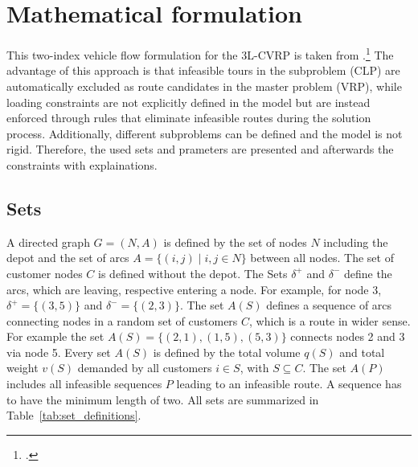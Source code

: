 \section{Mathematical formulation}
\label{sec:mathematical_formulation}

This two-index vehicle flow formulation for the \gls{3L-CVRP} is taken from \cite{tamke_branch-and-cut_2024}.\footcite[cf.][p. 6f]{tamke_branch-and-cut_2024}
The advantage of this approach is that infeasible tours in the subproblem (\gls{CLP}) are automatically excluded as route candidates
in the master problem (\gls{VRP}), while loading constraints are not explicitly defined in the model but are instead enforced through
rules that eliminate infeasible routes during the solution process. Additionally, different subproblems can be defined and the model is
not rigid. Therefore, the used sets and prameters are presented and afterwards the constraints with explainations.

\subsection*{Sets}
A directed graph $G=(N,A)$ is defined by the set of nodes $N$ including the depot and the set of arcs
$A = \{ (i, j) \mid i, j \in N \}$ between all nodes. The set of customer nodes $C$ is defined without the depot.
The Sets $\delta^+$ and $\delta^-$ define the arcs, which are leaving, respective entering a node.
For example, for node 3, $\delta^+ = \{(3,5)\}$ and $\delta^-= \{(2,3)\}$.
The set $A(S)$ defines a sequence of arcs connecting nodes in a random set of customers $C$,
which is a route in wider sense. For example the set $A(S)=\{(2,1),(1,5),(5,3)\}$ connects nodes
2 and 3 via node 5. Every set $A(S)$ is defined by the total volume $q(S)$ and total weight $v(S)$
demanded by all customers $i \in S$, with $S \subseteq C$. The set $A(P)$ includes all infeasible sequences $P$ leading
to an infeasible route. A sequence has to have the minimum length of two. All sets are summarized in Table~\ref{tab:set_definitions}.

